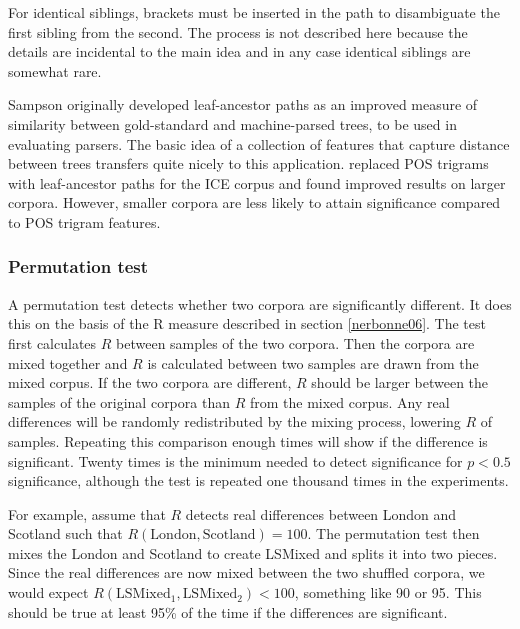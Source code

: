 \documentclass[11pt]{article}
\begin{document}
For identical siblings, brackets must be inserted in the path to
disambiguate the first sibling from the second. The process is not
described here because the details are incidental to the main idea and
in any case identical siblings are somewhat rare.

Sampson originally developed leaf-ancestor paths as an improved
measure of similarity between gold-standard and machine-parsed trees,
to be used in evaluating parsers. The basic idea of a collection of
features that capture distance between trees transfers quite nicely to
this application.  replaced POS trigrams with
leaf-ancestor paths for the ICE corpus and found improved results on
larger corpora. However, smaller corpora are less likely to attain
significance compared to POS trigram features.


\subsubsection{Permutation test}
\label{permutationtest}

A permutation test detects whether two corpora are significantly
different. It does this on the basis of the R measure described in
section \ref{nerbonne06}. The test first calculates $R$ between
samples of the two corpora. Then the corpora are mixed together and
$R$ is calculated between two samples are drawn from the mixed
corpus. If the two corpora are different, $R$ should be larger between
the samples of the original corpora than $R$ from the mixed
corpus. Any real differences will be randomly redistributed by the
mixing process, lowering $R$ of samples. Repeating this comparison
enough times will show if the difference is significant. Twenty times
is the minimum needed to detect significance for $p < 0.5$
significance, although the test is repeated one thousand times in the
experiments.

For example, assume that $R$ detects real differences between London
and Scotland such that $R(\textrm{London},\textrm{Scotland}) =
100$. The permutation test then mixes the London and Scotland to
create LSMixed and splits it into two pieces. Since the real
differences are now mixed between the two shuffled corpora, we
would expect $R(\textrm{LSMixed}_1, \textrm{LSMixed}_2) < 100$, something
like 90 or 95. This should be true at least 95\% of the time if the
differences are significant.
\end{document}
